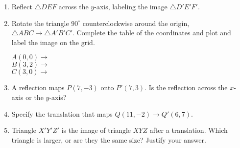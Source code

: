 \documentclass[12pt, twoside]{article}
\begin{document}
\begin{enumerate}[itemsep=0.5cm]
\item Reflect $\triangle DEF$ across the $y$-axis, labeling the image $\triangle D'E'F'$.
\begin{center}
\end{center}

\newpage
\item Rotate the triangle $90^\circ$ counterclockwise around the origin, $\triangle ABC \rightarrow \triangle A'B'C'$. Complete the table of the coordinates and plot and label the image on the grid. \vspace{0.5cm}
\begin{multicols}{2}
  $A(0,0) \rightarrow$ \\[0.7cm]
  $B(3,2) \rightarrow$ \\[0.7cm]
  $C(3,0) \rightarrow$ \\[0.7cm]
  \end{multicols}

\item A reflection maps $P(7,-3)$ onto $P'(7,3)$. Is the reflection across the $x$-axis or the $y$-axis? \vspace{2cm}

\item Specify the translation that maps $Q(11,-2)\rightarrow Q'(6,7)$. \vspace{2cm}

\item Triangle $X'Y'Z'$ is the image of triangle $XYZ$ after a translation. Which triangle is larger, or are they the same size? Justify your answer. \vspace{3cm}



\end{enumerate}
\end{document}

